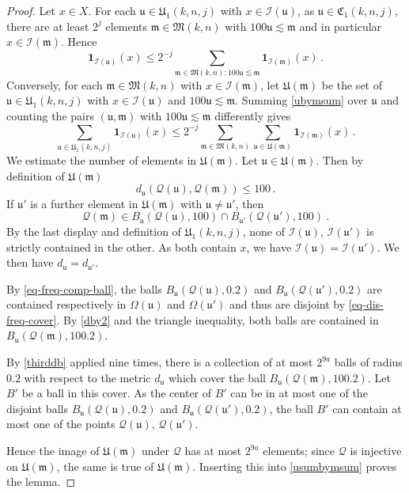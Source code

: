 \documentclass[10pt,a4paper]{article}
\theoremstyle{plain}
\theoremstyle{definition}
\numberwithin{equation}{subsection}
\newcommand{\fu}{{\mathfrak u}}
\newcommand{\fU}{{\mathfrak U}}
\newcommand{\fC}{{\mathfrak C}}
\newcommand{\fc}{{\Omega}}
\newcommand{\scI}{{\mathcal{I}}} %
\newcommand{\fcc}{{\mathcal{Q}}}
\newcommand{\leanok}{}
\begin{document}
\begin{proof}
\leanok
Let $x\in X$. For each
$\fu\in \fU_1(k,n,j)$ with $x\in \scI(\fu)$, as $\fu \in \fC_1(k,n,j)$,
there are at least $2^{j}$ elements $\mathfrak{m}\in \mathfrak{M}(k,n)$
with $100\fu \lesssim \mathfrak{m}$ and in particular
$x\in \scI(\mathfrak{m})$. Hence
\begin{equation}\label{ubymsum}
     \mathbf{1}_{\scI(\fu)}(x)
    \le 2^{-j}\sum_{\mathfrak{m} \in \mathfrak{M}(k,n): 100\fu\lesssim \mathfrak{m}} \mathbf{1}_{\scI(\mathfrak{m})}(x)\, .
\end{equation}
Conversely, for each $\mathfrak{m}\in \mathfrak{M}(k,n)$
with $x\in \scI(\mathfrak{m})$,
let $\fU(\mathfrak{m})$ be the set of
$\fu\in \fU_1(k,n,j)$ with $x\in \scI(\fu)$
and $100\fu \lesssim \mathfrak{m}$.
Summing \eqref{ubymsum} over $\fu$ and counting the pairs
$(\fu,\mathfrak{m})$ with $100\fu \lesssim \mathfrak{m}$
differently gives
\begin{equation}\label{usumbymsum}
     \sum_{\fu\in \fU_1(k,n,j)} \mathbf{1}_{\scI(\fu)}(x)
    \le 2^{-j}\sum_{\mathfrak{m} \in \mathfrak{M}(k,n)}
    \sum_{\fu \in \fU(\mathfrak{m})} \mathbf{1}_{\scI(\mathfrak{m})}(x)\, .
\end{equation}
We estimate the number of elements in $\fU(\mathfrak{m})$.
Let $\fu \in \fU(\mathfrak{m})$.
Then by definition of
$\fU(\mathfrak{m})$
\begin{equation}\label{dby2}
     d_{\fu}(\fcc(\fu),\fcc(\mathfrak{m}))\le 100\, .
\end{equation}
If $\fu'$ is a further element in $\fU(\mathfrak{m})$ with $\fu\neq \fu'$, then
\begin{equation}
    \fcc(\mathfrak{m})
    \in B_{\fu}(\fcc(\fu),100)\cap B_{\fu'}(\fcc(\fu'),100)\ .
\end{equation}
By the last display and definition of $\fU_1(k,n,j)$, none of $\scI(\fu)$, $\scI(\fu')$ is strictly contained in the other. As both contain $x$, we have $\scI(\fu)=\scI(\fu')$.
We then have $d_{\fu}=d_{\fu'}$.

By \eqref{eq-freq-comp-ball}, the balls
$B_{\fu}(\fcc(\fu),0.2)$ and
$B_{\fu}(\fcc(\fu'),0.2)$ are
contained respectively in $\fc(\fu)$
and $\fc(\fu')$ and thus are disjoint by \eqref{eq-dis-freq-cover}.
By \eqref{dby2} and the triangle inequality, both balls are contained in $B_{\fu}(\fcc(\mathfrak{m}), 100.2)$.

By \eqref{thirddb} applied nine times, there is a collection of at most
$2^{9a}$ balls of radius $0.2$ with respect to the metric $d_{\fu}$ which cover the ball $B_{\fu}(\fcc(\mathfrak{m}),100.2)$.
Let $B'$ be a ball in this cover.
As the center of $B'$ can be in at most one of the disjoint balls
$B_{\fu}(\fcc(\fu),0.2)$ and
$B_{\fu}(\fcc(\fu'),0.2)$,
the ball $B'$ can contain at most
one of the points $\fcc(\fu)$, $\fcc(\fu')$.

Hence the image of $\fU(\mathfrak{m})$ under $\fcc$ has at most
$2^{9a}$ elements; since $\fcc$ is injective on $\fU(\mathfrak{m})$,
the same is true of $\fU(\mathfrak{m})$.
Inserting this into \eqref{usumbymsum} proves the lemma.
\end{proof}
\end{document}
